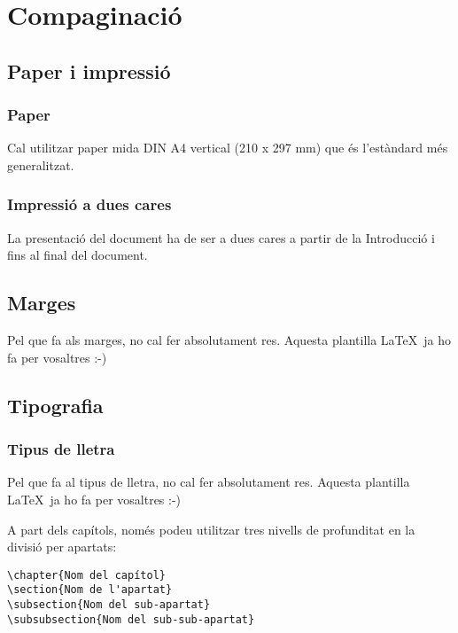 \chapter{Compaginació}\label{C:compaginacio}

\section{Paper i impressió}

\subsection{Paper}

Cal utilitzar paper mida DIN A4 vertical (210 x 297 mm)  que és l'estàndard més generalitzat.

\subsection{Impressió a dues cares}

La presentació del document ha de ser a dues cares a partir de la Introducció i fins al final del document.


\section{Marges}

Pel que fa als marges, no cal fer absolutament res. Aquesta plantilla \LaTeX \ ja ho fa per vosaltres :-)


\section{Tipografia}

\subsection{Tipus de lletra}

Pel que fa al tipus de lletra, no cal fer absolutament res. Aquesta plantilla \LaTeX \ ja ho fa per vosaltres :-)

A part dels capítols, només podeu utilitzar tres nivells de profunditat en la divisió per apartats:

\begin{verbatim}
\chapter{Nom del capítol}
\section{Nom de l'apartat}
\subsection{Nom del sub-apartat}
\subsubsection{Nom del sub-sub-apartat}
 \end{verbatim}



